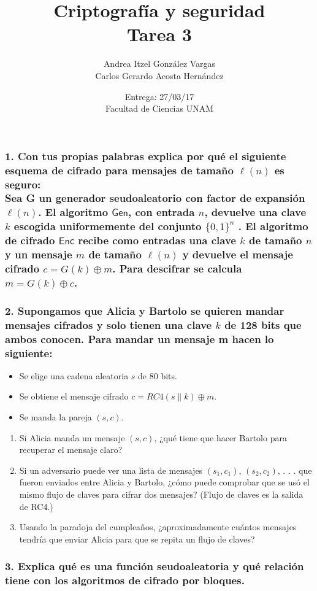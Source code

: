 \documentclass[12pt]{article}
\title{Criptografía y seguridad \\ Tarea 3}
\author{Andrea Itzel González Vargas \\ Carlos Gerardo Acosta Hernández}
\date{Entrega: 27/03/17 \\ Facultad de Ciencias UNAM}
\begin{document}
\maketitle
\subsubsection*{1. Con tus propias palabras explica por qué el siguiente esquema de cifrado para mensajes de tamaño $\ell(n)$ es seguro: \\
Sea G un generador seudoaleatorio con factor de expansión $\ell (n)$. El algoritmo $\textsf{Gen}$, con entrada $n$, devuelve una clave $k$ escogida uniformemente del conjunto $\{0, 1\}^n$ . El algoritmo de cifrado $\textsf{Enc}$ recibe como entradas una clave $k$ de tamaño $n$ y un mensaje $m$ de tamaño $\ell (n)$ y devuelve el mensaje cifrado $c = G(k) \oplus m$. Para descifrar se calcula $m = G(k) \oplus c$.}

\subsubsection*{2. Supongamos que Alicia y Bartolo se quieren mandar mensajes cifrados y solo tienen una clave $k$ de 128 bits que ambos conocen. Para mandar un mensaje m hacen lo siguiente:}
\begin{itemize}
\item Se elige una cadena aleatoria $s$ de 80 bits.
\item Se obtiene el mensaje cifrado $c = RC4(s \parallel k) \oplus m$.
\item Se manda la pareja $(s, c)$.
\end{itemize}
\begin{enumerate}[label=\alph*)]
\item Si Alicia manda un mensaje $(s, c)$, ¿qué tiene que hacer Bartolo para recuperar el mensaje claro?
\item Si un adversario puede ver una lista de mensajes $(s_1, c_1)$, $(s_2, c_2)$, . . . que fueron enviados entre Alicia y Bartolo, ¿cómo puede comprobar que se usó el mismo flujo de claves para cifrar dos mensajes? (Flujo de claves es la salida de RC4.)
\item Usando la paradoja del cumpleaños, ¿aproximadamente cuántos mensajes tendría que enviar Alicia para que se repita un flujo de claves?
\end{enumerate}

\subsubsection*{3. Explica qué es una función seudoaleatoria y qué relación tiene con los algoritmos de cifrado por bloques.}
\end{document}
